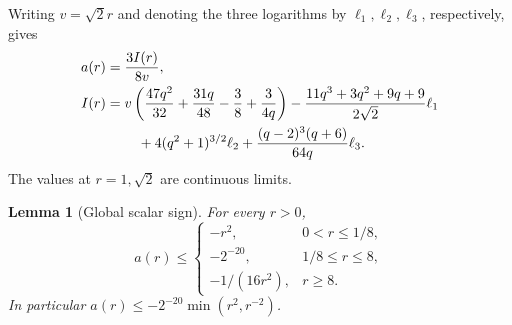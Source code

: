 \documentclass[11pt,a4paper]{amsart}
\newtheorem{lemma}[theorem]{Lemma}
\theoremstyle{definition}
\theoremstyle{remark}
\numberwithin{equation}{section}
\begin{document}
Writing $v=\sqrt2r$ and denoting the three logarithms by
$\ell_1,\ell_2,\ell_3$, respectively, gives
\begin{align}
 a(r)&=\frac{3I(r)}{8v},\notag\\
 I(r)&=v\left(\frac{47q^2}{32}+\frac{31q}{48}-\frac38+\frac3{4q}\right)
 -\frac{11q^3+3q^2+9q+9}{2\sqrt2}\ell_1\notag\\
 &\hspace{8mm}+4(q^2+1)^{3/2}\ell_2
      +\frac{(q-2)^3(q+6)}{64q}\ell_3.
 \label{fnd:radial}
\end{align}
The values at $r=1,\sqrt2$ are continuous limits.

\begin{lemma}[Global scalar sign]\label{fnd:radial-sign}
For every $r>0$,
\begin{equation}
 a(r)\le\begin{cases}
 -r^2,&0<r\le1/8,\\
 -2^{-20},&1/8\le r\le8,\\
 -1/(16r^2),&r\ge8.
 \end{cases}
 \label{fnd:radial-sign-bound}
\end{equation}
In particular $a(r)\le-2^{-20}\min(r^2,r^{-2})$.
\end{lemma}
\end{document}
